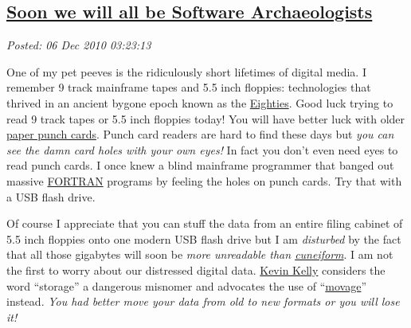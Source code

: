 %

\subsection*{\href{http://bakerjd99.wordpress.com/2010/12/06/soon-we-will-all-be-software-archeologists/}{Soon we will all be Software Archaeologists}}


\noindent\emph{Posted: 06 Dec 2010 03:23:13}
\vspace{6pt}

One of my pet peeves is the ridiculously short lifetimes of digital
media. I remember 9 track mainframe tapes and 5.5 inch floppies:
technologies that thrived in an ancient bygone epoch known as the
\href{http://www.google.com/images?hl=en\&q=the+eighties\&um=1\&ie=UTF-8\&source=univ\&ei=LrgCTfL1A4fEnAesmuTlDQ\&sa=X\&oi=image\_result\_group\&ct=title\&resnum=1\&ved=0CCkQsAQwAA\&biw=888\&bih=495}{Eighties}.
Good luck trying to read 9 track tapes or 5.5 inch floppies today! You
will have better luck with older
\href{http://www.computerhistory.org/collections/accession/102688725}{paper
punch cards}. Punch card readers are hard to find these days but
\emph{you can see the damn card holes with your own eyes!} In fact you
don't even need eyes to read punch cards. I once knew a blind mainframe
programmer that banged out massive
\href{http://en.wikipedia.org/wiki/Fortran}{FORTRAN} programs by feeling
the holes on punch cards. Try that with a USB flash drive.

Of course I appreciate that you can stuff the data from an entire filing
cabinet of 5.5 inch floppies onto one modern USB flash drive but I am
\emph{disturbed} by the fact that all those gigabytes will soon be
\emph{more unreadable than
\href{http://en.wikipedia.org/wiki/Cuneiform\_script}{cuneiform}}. I am
not the first to worry about our distressed digital data.
\href{http://kk.org/}{Kevin Kelly} considers the word ``storage'' a
dangerous misnomer and advocates the use of
``\href{http://www.kk.org/thetechnium/archives/2008/12/movage.php}{movage}''
instead. \emph{You had better move your data from old to new formats or
you will lose it!}


